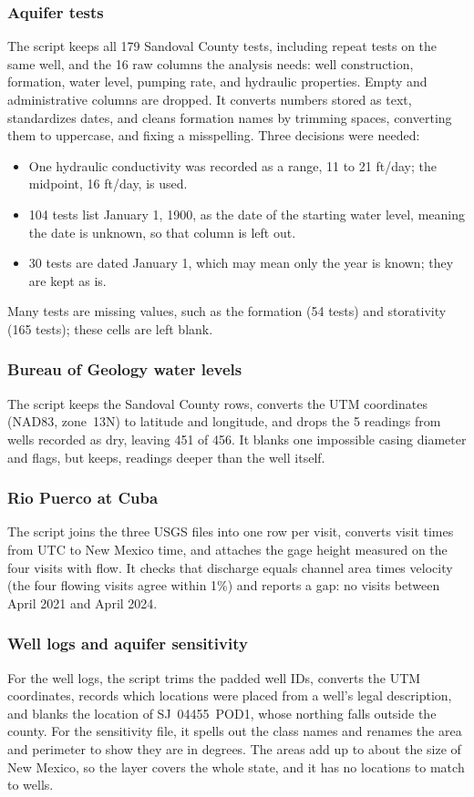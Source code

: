 \documentclass[10pt,twocolumn,letterpaper]{article}
\begin{document}
\subsubsection{Aquifer tests}
The script keeps all 179 Sandoval County tests, including repeat tests on the same well, and the
16 raw columns the analysis needs: well construction, formation, water level, pumping rate, and
hydraulic properties. Empty and administrative columns are dropped. It converts numbers stored as
text, standardizes dates, and cleans formation names by trimming spaces, converting them to
uppercase, and fixing a misspelling. Three decisions were needed:
\begin{itemize}
  \item One hydraulic conductivity was recorded as a range, 11 to 21 ft/day; the midpoint,
        16 ft/day, is used.
  \item 104 tests list January 1, 1900, as the date of the starting water level, meaning the
        date is unknown, so that column is left out.
  \item 30 tests are dated January 1, which may mean only the year is known; they are kept as is.
\end{itemize}
Many tests are missing values, such as the formation (54 tests) and storativity (165 tests); these
cells are left blank.

\subsubsection{Bureau of Geology water levels}
The script keeps the Sandoval County rows, converts the UTM coordinates (NAD83, zone~13N) to
latitude and longitude, and drops the 5 readings from wells recorded as dry, leaving 451 of 456.
It blanks one impossible casing diameter and flags, but keeps, readings deeper than the well itself.

\subsubsection{Rio Puerco at Cuba}
The script joins the three USGS files into one row per visit, converts visit times from UTC to New
Mexico time, and attaches the gage height measured on the four visits with flow. It checks that
discharge equals channel area times velocity (the four flowing visits agree within 1\%) and
reports a gap: no visits between April 2021 and April 2024.

\subsubsection{Well logs and aquifer sensitivity}
For the well logs, the script trims the padded well IDs, converts the UTM coordinates, records which
locations were placed from a well's legal description, and blanks the location of SJ~04455~POD1,
whose northing falls outside the county. For the sensitivity file, it spells out the class names and
renames the area and perimeter to show they are in degrees. The areas add up to about the size of
New Mexico, so the layer covers the whole state, and it has no locations to match to wells.
\end{document}
